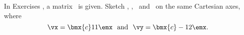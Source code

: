 {\noin In Exercises}
{, a matrix \tta\ is given. Sketch \vx, \vy, \tta\vx\ and \tta\vy\ on the same Cartesian axes, where
\[
\vx = \bmx{c}1\\1\emx \ \text{ and } \ \vy=\bmx{c}-1\\2\emx.
\]}
